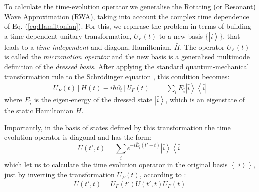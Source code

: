 \documentclass[10pt,a4paper]{article}
\begin{document}
To calculate the time-evolution operator we generalise the Rotating (or Resonant) Wave Approximation (RWA), taking into account the complex time dependence of Eq. (\ref{eq:Hamiltonian}). For this, we rephrase the problem in terms of building a time-dependent unitary transformation, $U_F(t)$ to a new basis $\{\left| \bar{i} \right\rangle\}$, that leads to a \textit{time-independent} and diagonal Hamiltonian, $\bar{H}$. The operator $U_F(t)$ is called the \textit{micromotion operator} and the new basis is a generalised multimode definition of the \textit{dressed basis}. After applying the standard quantum-mechanical transformation rule to the Schr\"odinger equation \cite{chu1985recent,PhysRevA.81.063626}, this condition becomes:
\begin{eqnarray}
 U_F^\dagger(t) \left[ H(t) - i \hbar \partial_t \right] U_F(t)  &=& \sum_{\bar{i}} \bar{E}_{\bar{i}} \left| \bar{i} \right\rangle \left\langle \bar{i} \right|
\label{eq:Hdressed}
\end{eqnarray}
where $\bar{E}_{\bar{i}}$ is the eigen-energy of the dressed state  $\left| \bar{i} \right\rangle$, which is an eigenstate of the static Hamiltonian $\bar{H}$.

Importantly, in the basis of states defined by this transformation the time evolution operator is diagonal and has the form:
\begin{equation}
\bar{U}(t',t) = \sum_{\bar{i}} e^{-i \bar{E}_{\bar{i}} (t'-t)} \left| \bar{i} \right\rangle \left\langle \bar{i} \right|
\label{eq:dressedtimeevolution}
\end{equation}
which let us to calculate the time evolution operator in the original basis $\left\{ \left| i\right\rangle\right\}$, just by inverting the transformation $U_F(t)$, according to \cite{PhysRevA.81.063626}:
\begin{equation}
U(t',t) = U_F(t') \bar{U}(t',t) U_F(t)
\label{eq:baretimeevolution}
\end{equation}
\end{document}
